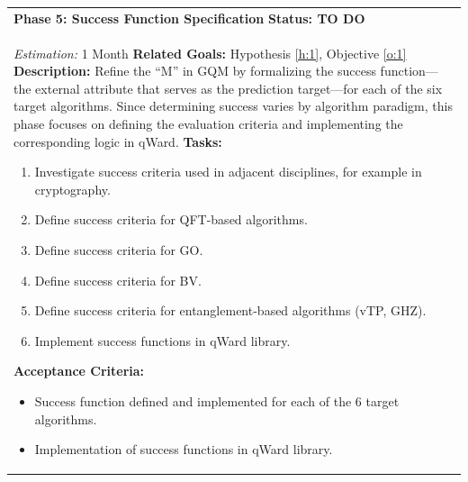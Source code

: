 \documentclass{article}
\begin{document}
\begin{longtable}{@{}p{\textwidth}@{}}
    \textbf{Phase 5: Success Function Specification} \label{p:5} \hfill \textbf{Status: TO DO} \\
    \textit{Estimation:} 1 Month \newline
    \textbf{Related Goals:} Hypothesis \ref{h:1}, Objective \ref{o:1} \newline
    \textbf{Description:} Refine the ``M'' in GQM by formalizing the success function---the external attribute that serves as the prediction target---for each of the six target algorithms. Since determining success varies by algorithm paradigm, this phase focuses on defining the evaluation criteria and implementing the corresponding logic in qWard. \newline
    \textbf{Tasks:}
    \begin{enumerate}[label=T5.\arabic*, ref=T5.\arabic*, font=\bfseries, leftmargin=3.5em, labelindent=0pt, itemindent=0pt, labelsep=0.5em, noitemsep, topsep=0pt]
        \item \label{p5:t1} Investigate success criteria used in adjacent disciplines, for example in cryptography. 
        \item \label{p5:t2} Define success criteria for QFT-based algorithms.
        \item \label{p5:t3} Define success criteria for GO.
        \item \label{p5:t4} Define success criteria for BV.
        \item \label{p5:t5a} Define success criteria for entanglement-based algorithms (vTP, GHZ).
        \item \label{p5:t5} Implement success functions in qWard library.
    \end{enumerate}
    \textbf{Acceptance Criteria:}
    \begin{itemize}[leftmargin=1.5em, labelindent=0pt, itemindent=0pt, noitemsep, topsep=0pt]
        \item Success function defined and implemented for each of the 6 target algorithms.
        \item Implementation of success functions in qWard library.
    \end{itemize} \\
    \midrule
    

\end{longtable}
\end{document}
